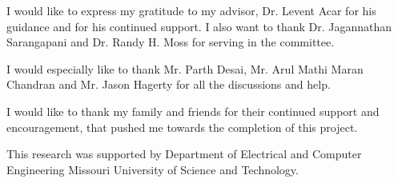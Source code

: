 I would like to express my gratitude to my advisor, Dr. Levent Acar for his guidance and for his continued support. I also want to thank Dr. Jagannathan Sarangapani and Dr. Randy H. Moss for serving in the committee. 

I would especially like to thank Mr. Parth Desai, Mr. Arul Mathi Maran Chandran and Mr. Jason Hagerty for all the discussions and help.

I would like to thank my family and friends for their continued support and encouragement, that pushed me towards the completion of this project.

This research was supported by Department of Electrical and Computer Engineering Missouri University of Science and Technology.  

